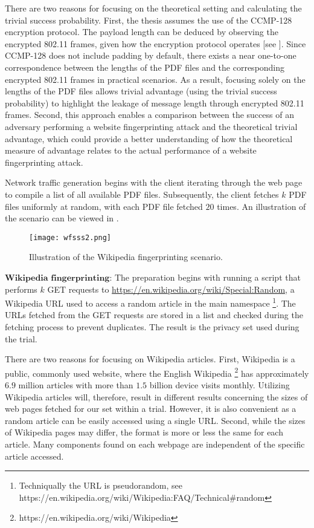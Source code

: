 There are two reasons for focusing on the theoretical setting and calculating the trivial success probability. First, the thesis assumes the use of the CCMP-128 encryption protocol. The payload length can be deduced by observing the encrypted 802.11 frames, given how the encryption protocol operates [see ]. Since CCMP-128 does not include padding by default, there exists a near one-to-one correspondence between the lengths of the PDF files and the corresponding encrypted 802.11 frames in practical scenarios. As a result, focusing solely on the lengths of the PDF files allows trivial advantage (using the trivial success probability) to highlight the leakage of message length through encrypted 802.11 frames. Second, this approach enables a comparison between the success of an adversary performing a website fingerprinting attack and the theoretical trivial advantage, which could provide a better understanding of how the theoretical measure of advantage relates to the actual performance of a website fingerprinting attack.

Network traffic generation begins with the client iterating through the web page to compile a list of all available PDF files. Subsequently, the client fetches $k$ PDF files uniformly at random, with each PDF file fetched $20$ times. An illustration of the scenario can be viewed in . \\

\begin{figure}
	\centering
        \texttt{[image: wfsss2.png]}
           \caption{Illustration of the Wikipedia fingerprinting scenario.}
    \label{fig:wfsss2}
\end{figure}

$\textbf{Wikipedia fingerprinting}$: The preparation begins with running a script that performs $k$ GET requests to \url{https://en.wikipedia.org/wiki/Special:Random}, a Wikipedia URL used to access a random article in the main namespace \footnote{Techniqually the URL  is pseudorandom, see https://en.wikipedia.org/wiki/Wikipedia:FAQ/Technical\#random}. The URLs fetched from the GET requests are stored in a list and checked during the fetching process to prevent duplicates. The result is the privacy set used during the trial. 

There are two reasons for focusing on Wikipedia articles. First, Wikipedia is a public, commonly used website, where the English Wikipedia \footnote{https://en.wikipedia.org/wiki/Wikipedia} has approximately $6.9$ million articles with more than $1.5$ billion device visits monthly. Utilizing Wikipedia articles will, therefore, result in different results concerning the sizes of web pages fetched for our set within a trial. However, it is also convenient as a random article can be easily accessed using a single URL. Second, while the sizes of Wikipedia pages may differ, the format is more or less the same for each article. Many components found on each webpage are independent of the specific article accessed.

